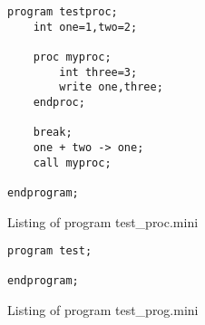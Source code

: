 \documentclass[english]{article}
\begin{document}
\begin{program}
\begin{verbatim}
program testproc;
	int one=1,two=2;

	proc myproc;
		int three=3;
		write one,three;
	endproc;

	break;
	one + two -> one;
	call myproc;

endprogram;\end{verbatim}
\caption{Listing of program test\_proc.mini}
\end{program}

\begin{program}
\begin{verbatim}
program test;

endprogram;
\end{verbatim}
\caption{Listing of program test\_prog.mini}
\end{program}
\end{document}
